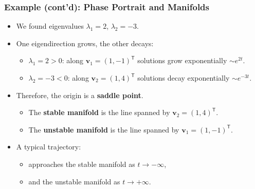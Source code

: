 \documentclass{beamer}
\begin{document}
\begin{frame}
  \frametitle{Example (cont’d): Phase Portrait and Manifolds}

  \begin{itemize}
    \item We found eigenvalues $\lambda_1=2$, $\lambda_2=-3$.
    \item One eigendirection grows, the other decays:
      \begin{itemize}
        \item $\lambda_1=2>0$: along $\mathbf{v}_1=(1,-1)^\mathsf{T}$
          solutions grow exponentially $\sim e^{2t}$.
        \item $\lambda_2=-3<0$: along $\mathbf{v}_2=(1,4)^\mathsf{T}$
          solutions decay exponentially $\sim e^{-3t}$.
      \end{itemize}
    \item Therefore, the origin is a \textbf{saddle point}.
      \begin{itemize}
        \item The \textbf{stable manifold} is the line
          spanned by $\mathbf{v}_2=(1,4)^\mathsf{T}$.
        \item The \textbf{unstable manifold} is the line
          spanned by $\mathbf{v}_1=(1,-1)^\mathsf{T}$.
      \end{itemize}
    \item A typical trajectory:
      \begin{itemize}
        \item approaches the stable manifold as $t\to -\infty$,
        \item and the unstable manifold as $t\to +\infty$.
      \end{itemize}
  \end{itemize}
\end{frame}
\end{document}
